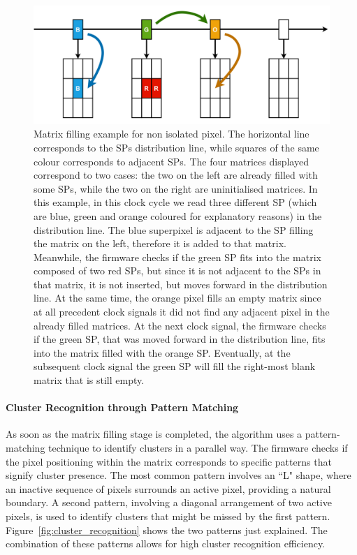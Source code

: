 \begin{figure}
    \centering
    \includegraphics[width=\textwidth]{figures/matrix_filling_clustering.png}
    \caption{Matrix filling example for non isolated pixel. The horizontal line corresponds to the SPs distribution line, while squares of the same colour corresponds to adjacent SPs. The four matrices displayed correspond to two cases: the two on the left are already filled with some SPs, while the two on the right are uninitialised matrices. In this example, in this clock cycle we read three different SP (which are blue, green and orange coloured for explanatory reasons) in the distribution line. The blue superpixel is adjacent to the SP filling the matrix on the left, therefore it is added to that matrix. Meanwhile, the firmware checks if the green SP fits into the matrix composed of two red SPs, but since it is not adjacent to the SPs in that matrix, it is not inserted, but moves forward in the distribution line. At the same time, the orange pixel fills an empty matrix since at all precedent clock signals it did not find any adjacent pixel in the already filled matrices. At the next clock signal, the firmware checks if the green SP, that was moved forward in the distribution line, fits into the matrix filled with the orange SP. Eventually, at the subsequent clock signal the green SP will fill the right-most blank matrix that is still empty.}
    \label{fig:matrix_filling_clustering}
\end{figure}

\paragraph{Cluster Recognition through Pattern Matching}
As soon as the matrix filling stage is completed, the algorithm uses a pattern-matching technique to identify clusters in a parallel way. The firmware checks if the pixel positioning within the matrix corresponds to specific patterns that signify cluster presence. The most common pattern involves an ``L" shape, where an inactive sequence of pixels surrounds an active pixel, providing a natural boundary. A second pattern, involving a diagonal arrangement of two active pixels, is used to identify clusters that might be missed by the first pattern. Figure~\ref{fig:cluster_recognition} shows the two patterns just explained. The combination of these patterns allows for high cluster recognition efficiency.

